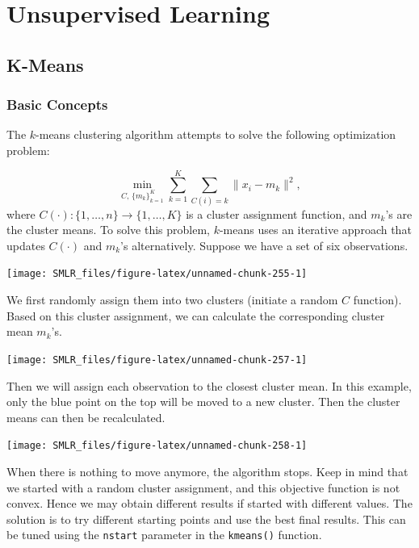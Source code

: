 \documentclass[
]{book}
\theoremstyle{definition}
\theoremstyle{definition}
\theoremstyle{definition}
\theoremstyle{definition}
\theoremstyle{remark}
\begin{document}
\hypertarget{part-unsupervised-learning}{%
\part{Unsupervised Learning}\label{part-unsupervised-learning}}

\hypertarget{k-means}{%
\chapter{K-Means}\label{k-means}}

\hypertarget{basic-concepts}{%
\section{Basic Concepts}\label{basic-concepts}}

The \(k\)-means clustering algorithm attempts to solve the following optimization problem:

\[ \underset{C, \, \{m_k\}_{k=1}^K}\min \sum_{k=1}^K \sum_{C(i) = k} \lVert x_i - m_k \rVert^2, \]
where \(C(\cdot): \{1, \ldots, n\} \rightarrow \{1, \ldots, K\}\) is a cluster assignment function, and \(m_k\)'s are the cluster means. To solve this problem, \(k\)-means uses an iterative approach that updates \(C(\cdot)\) and \(m_k\)'s alternatively. Suppose we have a set of six observations.

\begin{center}\texttt{[image: SMLR\_files/figure-latex/unnamed-chunk-255-1]} \end{center}

We first randomly assign them into two clusters (initiate a random \(C\) function). Based on this cluster assignment, we can calculate the corresponding cluster mean \(m_k\)'s.

\begin{center}\texttt{[image: SMLR\_files/figure-latex/unnamed-chunk-257-1]} \end{center}

Then we will assign each observation to the closest cluster mean. In this example, only the blue point on the top will be moved to a new cluster. Then the cluster means can then be recalculated.

\begin{center}\texttt{[image: SMLR\_files/figure-latex/unnamed-chunk-258-1]} \end{center}

When there is nothing to move anymore, the algorithm stops. Keep in mind that we started with a random cluster assignment, and this objective function is not convex. Hence we may obtain different results if started with different values. The solution is to try different starting points and use the best final results. This can be tuned using the \texttt{nstart} parameter in the \texttt{kmeans()} function.
\end{document}

